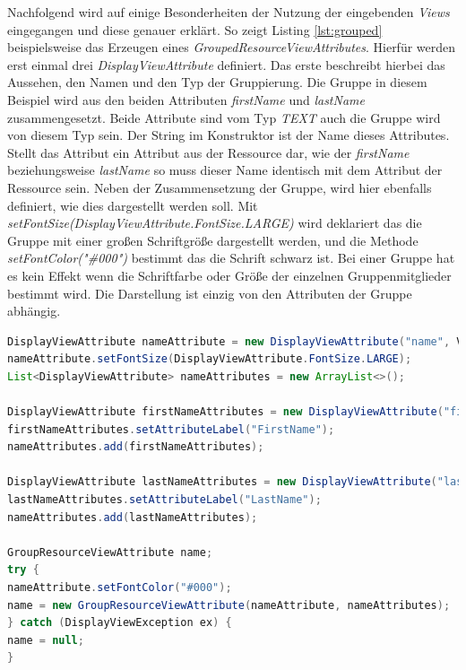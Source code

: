 Nachfolgend wird auf einige Besonderheiten der Nutzung der eingebenden \textit{Views} eingegangen und diese genauer erklärt. So zeigt Listing \ref{lst:grouped} beispielsweise das Erzeugen eines \textit{GroupedResourceViewAttributes}. Hierfür werden erst einmal drei \textit{DisplayViewAttribute} definiert. Das erste beschreibt hierbei das Aussehen, den Namen und den Typ der Gruppierung. Die Gruppe in diesem Beispiel wird aus den beiden Attributen \textit{firstName} und \textit{lastName} zusammengesetzt. Beide Attribute sind vom Typ \textit{TEXT} auch die Gruppe wird von diesem Typ sein. Der String im Konstruktor ist der Name dieses Attributes. Stellt das Attribut ein Attribut aus der Ressource dar, wie der \textit{firstName} beziehungsweise \textit{lastName} so muss dieser Name identisch mit dem Attribut der Ressource sein. Neben der Zusammensetzung der Gruppe, wird hier ebenfalls definiert, wie dies dargestellt werden soll. Mit \textit{setFontSize(DisplayViewAttribute.FontSize.LARGE)} wird deklariert das die Gruppe mit einer großen Schriftgröße dargestellt werden, und die Methode \textit{setFontColor("\#000")} bestimmt das die Schrift schwarz ist. Bei einer Gruppe hat es kein Effekt wenn die Schriftfarbe oder Größe der einzelnen Gruppenmitglieder bestimmt wird. Die Darstellung ist einzig von den Attributen der Gruppe abhängig.

\begin{lstlisting}[label=lst:grouped,
language=java,
firstnumber=1,
caption=Erstellung eines \textit{GroupedResourceViewAttributes}.]		
DisplayViewAttribute nameAttribute = new DisplayViewAttribute("name", ViewAttribute.AttributeType.TEXT);
nameAttribute.setFontSize(DisplayViewAttribute.FontSize.LARGE);
List<DisplayViewAttribute> nameAttributes = new ArrayList<>();

DisplayViewAttribute firstNameAttributes = new DisplayViewAttribute("firstName", ViewAttribute.AttributeType.TEXT);
firstNameAttributes.setAttributeLabel("FirstName");
nameAttributes.add(firstNameAttributes);

DisplayViewAttribute lastNameAttributes = new DisplayViewAttribute("lastName", ViewAttribute.AttributeType.TEXT);
lastNameAttributes.setAttributeLabel("LastName");
nameAttributes.add(lastNameAttributes);

GroupResourceViewAttribute name;
try {
nameAttribute.setFontColor("#000");
name = new GroupResourceViewAttribute(nameAttribute, nameAttributes);
} catch (DisplayViewException ex) {
name = null;
}
\end{lstlisting}

